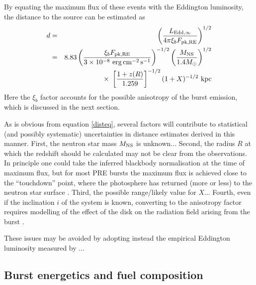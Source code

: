 \documentclass{aastex63}
\newcommand{\epcs}{{\rm erg\,cm^{-2}\,s^{-1}}}
\newcommand{\opz}{1.259}
\begin{document}
By equating the maximum flux of these events with the Eddington luminosity, the distance to the source can be estimated as
\begin{eqnarray}
 d & = & \left(\frac{L_{\rm Edd,\infty}}{4\pi \xi_b F_{\rm pk, RE}}\right)^{1/2} \nonumber \\
   & = & 8.83
	\left( \frac{\xi_b F_{\rm pk, RE}}{3\times10^{-8}\ \epcs} \right)^{-1/2}
       	\left(\frac{M_{\rm NS}}{1.4M_\odot}\right)^{1/2}
\nonumber \\ & & \times\  %
	\left[\frac{1+z(R)}{\opz}\right]^{-1/2}
	(1+X)^{-1/2}\ {\rm kpc}
 \label{disteq}
\end{eqnarray}
% 
Here the $\xi_b$ factor accounts for the possible anisotropy of the burst emission, 
which is discussed in the next section.

As is obvious from equation \ref{disteq}, several factors will contribute to statistical (and possibly systematic) uncertainties in distance estimates derived in this manner. First, the neutron star mass $M_{\rm NS}$ is unknown...
%
Second, the radius $R$ at which the redshift should be calculated may not be clear from the observations. In principle one could take the inferred blackbody normalisation at the time of maximum flux, but for most PRE bursts the maximum flux is achieved close to the ``touchdown'' point, where the photosphere has returned (more or less) to the neutron star surface \cite[e.g.][]{gal06a}.
%
Third, the possible range/likely value for $X$...
%
Fourth, even if the inclination $i$ of the system is known, converting to the anisotropy factor requires modelling of the effect of the disk on the radiation field arising from the burst \cite[e.g.][]{he16}.

These issues may be avoided by adopting instead the empirical Eddington luminosity measured by \cite[]{kuul03a}...

\subsection{Burst energetics and fuel composition}
\label{subsec:energetics}

\label{subsec:energy}
\end{document}
